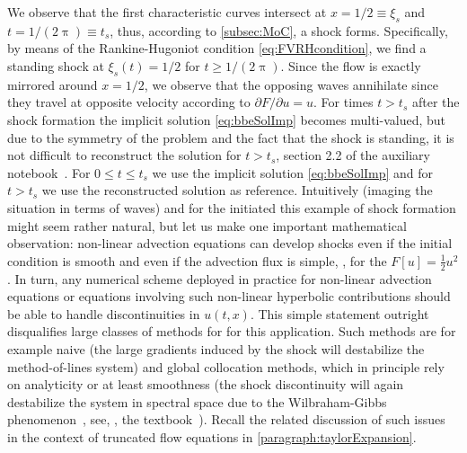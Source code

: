 We observe that the first characteristic curves intersect at $x=1/2\equiv \xi_s$ and $t=1/(2\uppi)\equiv t_s$, thus, according to \cref{subsec:MoC}, a shock forms.
Specifically, by means of the Rankine-Hugoniot condition \eqref{eq:FVRHcondition}, we find a standing shock at $\xi_s(t)=1/2$ for $t\ge 1/(2\uppi)$.
Since the flow is exactly mirrored around $x=1/2$, we observe that the opposing waves annihilate since they travel at opposite velocity according to $\partial F/\partial u = u$.
For times $t>t_s$ \dash{} after the shock formation \dash{} the implicit solution \eqref{eq:bbeSolImp} becomes multi-valued, but due to the symmetry of the problem and the fact that the shock is standing, it is not difficult to reconstruct the solution for $t>t_s$, \cf{} section 2.2 of the auxiliary notebook~\cite{Steil:2023PhDFVNB}.
For $0\le t\le t_s$ we use the implicit solution \eqref{eq:bbeSolImp} and for $t>t_s$ we use the reconstructed solution as reference.
Intuitively (imaging the situation in terms of waves) and for the \cfd{} initiated this example of shock formation might seem rather natural, but let us make one important mathematical observation:
non-linear advection equations can develop shocks \dash{} even if the initial condition is smooth and even if the advection flux is simple, \ie{}, for the \bbeq{} $F[u]=\frac{1}{2}u^2$.
In turn, any numerical scheme deployed in practice for non-linear advection equations or equations involving such non-linear hyperbolic contributions should be able to handle discontinuities in $u(t,x)$. 
This simple statement outright disqualifies large classes of methods for \pdes{} for this application.
Such methods are for example naive  (the large gradients induced by the shock will destabilize the method-of-lines \ode{} system) and global collocation methods, which in principle rely on analyticity or at least smoothness (the shock discontinuity will again destabilize the \ode{} system in spectral space due to the Wilbraham-Gibbs phenomenon~\cite{Wilbraham:1848,Gibbs:1898,Gibbs:1899}, see, \eg{}, the textbook~\cite{boyd2001chebyshev}). 
Recall the related discussion of such issues in the context of truncated flow equations in \cref{paragraph:taylorExpansion}.

